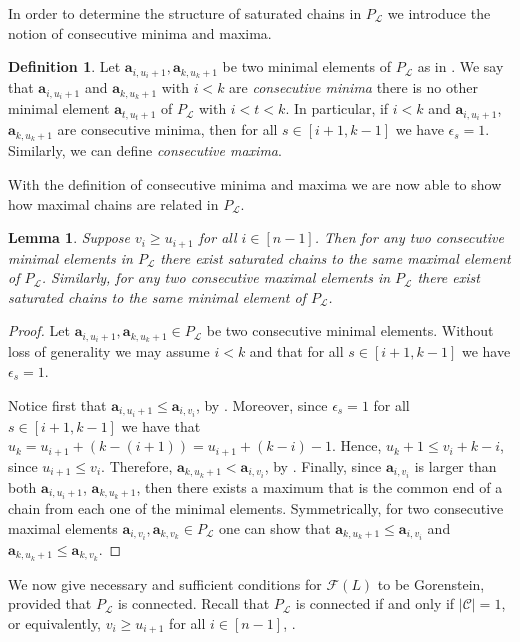 \documentclass[11pt,a4paper,reqno,dvipsnames]{amsart}
\theoremstyle{plain}
\newtheorem{Lemma}[Theorem]{Lemma}
\theoremstyle{definition}
\newtheorem{Assumptions and Discussion}[Theorem]{Assumptions and Discussion}
\newtheorem{Definition}[Theorem]{Definition}
\theoremstyle{remark}
\newcommand\bda{{\bm a}}
\newcommand\calC{\mathcal{C}}
\newcommand\calF{\mathcal{F}}
\newcommand\calL{\mathcal{L}}
\begin{document}
In order to determine the structure of saturated chains in $P_{\calL}$ we introduce the notion of consecutive minima and maxima.

\begin{Definition}
    Let $\bda_{i,u_i+1}, \bda_{k, u_k+1}$ be two minimal elements of $P_{\calL}$ as in . We say that $\bda_{i,u_i+1}$ and $\bda_{k,u_k+1}$ with $i<k$ are \emph{consecutive minima} there is no other minimal element $\bda_{t,u_t+1}$ of $P_{\calL}$ with $i<t<k$. In particular, if $i<k$ and $\bda_{i,u_i+1}$, $\bda_{k,u_k+1}$ are consecutive minima, then for all $s\in [i+1,k-1]$ we have $\epsilon_{s}=1$. Similarly, we can define \emph{consecutive maxima}.
\end{Definition}


With the definition of consecutive minima and maxima we are now able to show how maximal chains are related in $P_{\calL}$.

\begin{Lemma}\label{lem:connected}
    Suppose  $v_{i} \ge u_{i+1}$ for all $i \in [n-1]$. Then for any two consecutive minimal elements in $P_{\calL}$ there exist saturated chains to the same maximal element of $P_{\calL}$.   
    Similarly,  for any two consecutive maximal elements in $P_{\calL}$ there exist saturated  chains to the same minimal element of $P_{\calL}$.
\end{Lemma}

\begin{proof}
Let $\bda_{i,u_i+1}, \bda_{k, u_k+1}\in P_{\calL}$ be two consecutive minimal elements. Without loss of generality we may assume $i<k$ and that for all $s\in [i+1,k-1]$ we have $\epsilon_{s}=1$. 

Notice first that $\bda_{i, u_i+1}\le \bda_{i,v_i}$, by . Moreover, since $\epsilon_s=1$ for all $s\in [i+1,k-1]$ we have that $u_{k}=u_{i+1}+(k-(i+1))=u_{i+1}+(k-i)-1$. Hence, $u_k+1\le v_i+k-i$, since $u_{i+1}\le v_i$. Therefore, $\bda_{k, u_k+1}<\bda_{i,v_i}$, by . Finally, since $\bda_{i,v_i}$ is larger than both $\bda_{i,u_i+1}$, $\bda_{k, u_k+1}$, then there exists a maximum that is the common end of a chain from each one of the minimal elements. Symmetrically, for two consecutive maximal elements $\bda_{i,v_i}, \bda_{k, v_k}\in P_{\calL}$ one can show that $\bda_{k,u_k+1}\le \bda_{i,v_i}$ and $\bda_{k,u_k+1}\le \bda_{k, v_k}$. 
\end{proof}


We now give necessary and sufficient conditions for $\calF(L)$ to be Gorenstein, provided that $P_{\calL}$ is connected. Recall that $P_{\calL}$ is connected if and only if $|\calC|=1$, 
or equivalently, $v_{i} \ge u_{i+1}$ for all $i \in [n-1]$, . 
\end{document}
